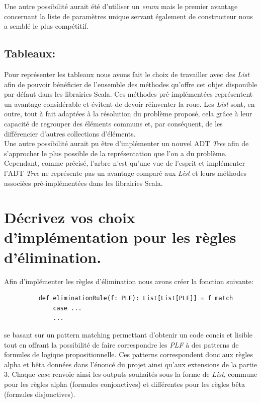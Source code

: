 \documentclass[a4paper, 11pt]{article}
\begin{document}
 Une autre possibilité aurait été d'utiliser un \textit{enum} mais le premier avantage concernant la liste de paramètres unique servant également de constructeur nous a semblé le plus compétitif.
 

\subsection{Tableaux:}
Pour représenter les tableaux nous avons fait le choix de travailler avec des \textit{List} afin de pouvoir bénéficier de l'ensemble des méthodes qu'offre cet objet disponible par défaut dans les librairies Scala. Ces méthodes pré-implémentées représentent un avantage considérable et évitent de devoir réinventer la roue. Les \textit{List} sont, en outre, tout à fait adaptées à la résolution du problème proposé, cela grâce à leur capacité de regrouper des éléments communs et, par conséquent, de les différencier d'autres collections d'éléments.\\

Une autre possibilité aurait pu être d'implémenter un nouvel ADT \textit{Tree} afin de s'approcher le plus possible de la représentation que l'on a du problème. Cependant, comme précisé, l'arbre n'est qu'une vue de l'esprit et implémenter l'ADT \textit{Tree} ne représente pas un avantage comparé aux \textit{List} et leurs méthodes associées pré-implémentées dans les librairies Scala.

\section{Décrivez vos choix d'implémentation pour les règles
d'élimination.}
Afin d'implémenter les règles d’élimination nous avons créer la fonction suivante:
\begin{figure}[htp]
    \centering
    \begin{verbatim}
    def eliminationRule(f: PLF): List[List[PLF]] = f match
        case ...
        ...
    \end{verbatim}
\end{figure}
 se basant sur un pattern matching permettant d'obtenir un code concis et lisible tout en offrant la possibilité de faire correspondre les \textit{PLF} à des patterns de formules de logique propositionnelle. Ces patterns correspondent donc aux règles alpha et bêta données dans l'énoncé du projet ainsi qu'aux extensions de la partie 3. Chaque \textit{case} renvoie ainsi les outputs souhaités sous la forme de \textit{List}, commune pour les règles alpha (formules conjonctives) et différentes pour les règles bêta (formules disjonctives).
\end{document}
